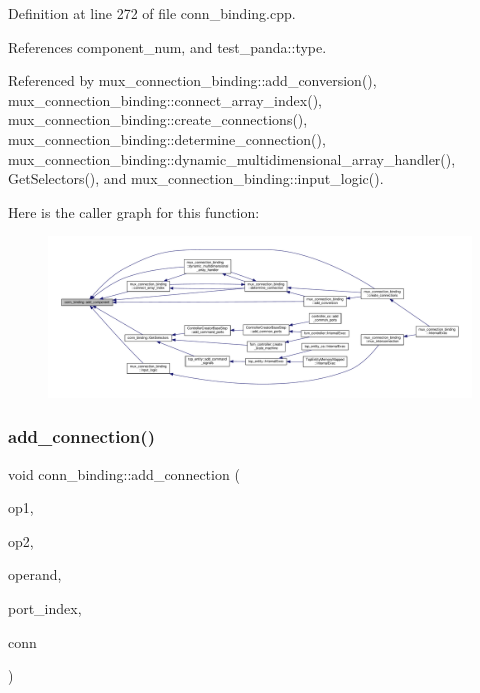 Definition at line 272 of file conn\+\_\+binding.\+cpp.



References component\+\_\+num, and test\+\_\+panda\+::type.



Referenced by mux\+\_\+connection\+\_\+binding\+::add\+\_\+conversion(), mux\+\_\+connection\+\_\+binding\+::connect\+\_\+array\+\_\+index(), mux\+\_\+connection\+\_\+binding\+::create\+\_\+connections(), mux\+\_\+connection\+\_\+binding\+::determine\+\_\+connection(), mux\+\_\+connection\+\_\+binding\+::dynamic\+\_\+multidimensional\+\_\+array\+\_\+handler(), Get\+Selectors(), and mux\+\_\+connection\+\_\+binding\+::input\+\_\+logic().

Here is the caller graph for this function\+:
\nopagebreak
\begin{figure}[H]
\begin{center}
\leavevmode
\includegraphics[width=350pt]{d2/db1/classconn__binding_a0d6764ed3f41fa21e131a4a5c3a84978_icgraph}
\end{center}
\end{figure}
\mbox{\label{classconn__binding_a2ca6e2f49d291760b4455cea98baebea}} 
\subsubsection{\texorpdfstring{add\+\_\+connection()}{add\_connection()}}
{\footnotesize\ttfamily void conn\+\_\+binding\+::add\+\_\+connection (\begin{DoxyParamCaption}\item[{const \hyperlink{generic__obj_8hpp_acb533b2ef8e0fe72e09a04d20904ca81}{generic\+\_\+obj\+Ref}}]{op1,  }\item[{const \hyperlink{generic__obj_8hpp_acb533b2ef8e0fe72e09a04d20904ca81}{generic\+\_\+obj\+Ref}}]{op2,  }\item[{unsigned int}]{operand,  }\item[{unsigned int}]{port\+\_\+index,  }\item[{\hyperlink{connection__obj_8hpp_af3c6e389c8543ed97dd9ba412f2c141b}{connection\+\_\+obj\+Ref}}]{conn }\end{DoxyParamCaption})}



